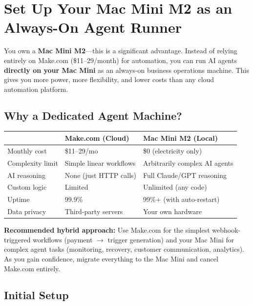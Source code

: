 \documentclass[12pt, letterpaper, oneside]{book}
\begin{document}
\chapter{Set Up Your Mac Mini M2 as an Always-On Agent Runner}

You own a \textbf{Mac Mini M2}---this is a significant advantage. Instead of relying entirely on Make.com (\$11--29/month) for automation, you can run AI agents \textbf{directly on your Mac Mini} as an always-on business operations machine. This gives you more power, more flexibility, and lower costs than any cloud automation platform.

\section{Why a Dedicated Agent Machine?}

\begin{table}[H]
\centering
\begin{tabularx}{\textwidth}{lXX}
\toprule
& \textbf{Make.com (Cloud)} & \textbf{Mac Mini M2 (Local)} \\
\midrule
Monthly cost & \$11--29/mo & \$0 (electricity only) \\
Complexity limit & Simple linear workflows & Arbitrarily complex AI agents \\
AI reasoning & None (just HTTP calls) & Full Claude/GPT reasoning \\
Custom logic & Limited & Unlimited (any code) \\
Uptime & 99.9\% & 99\%+ (with auto-restart) \\
Data privacy & Third-party servers & Your own hardware \\
\bottomrule
\end{tabularx}
\end{table}

\begin{successbox}
\textbf{Recommended hybrid approach:} Use Make.com for the simplest webhook-triggered workflows (payment $\rightarrow$ trigger generation) and your Mac Mini for complex agent tasks (monitoring, recovery, customer communication, analytics). As you gain confidence, migrate everything to the Mac Mini and cancel Make.com entirely.
\end{successbox}

\section{Initial Setup}
\end{document}
